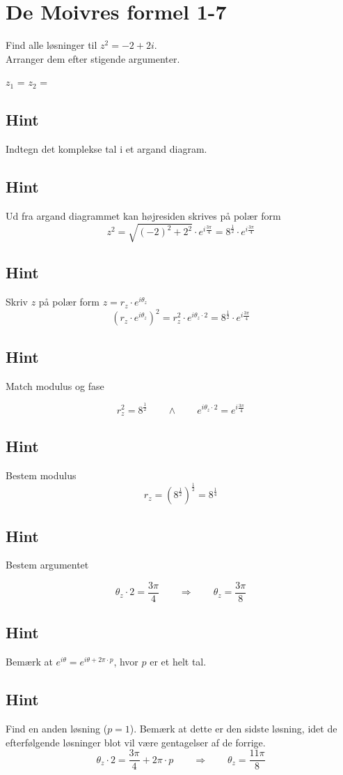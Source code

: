 \documentclass{article}
\newenvironment{exercise}[1]{\newpage\section{#1}}{}
\newcommand{\answerbox}[1]{\fbox{$#1$}}
\newcommand{\hint}{\subsection*{Hint}}
\begin{document}
\newpage

\begin{exercise}{De Moivres formel 1-7}
	
	Find alle løsninger til $z^2=-2+2i$. \\
	Arranger dem efter stigende argumenter.
	
	$z_1$ = \answerbox{8^{\frac{1}{4}} \cdot e^{i \frac{3\pi}{8}}}		$z_2$ = \answerbox{8^{\frac{1}{4}} \cdot e^{i \frac{11\pi}{8}}}	
	
	\hint 
	
	Indtegn det komplekse tal i et argand diagram. 
	
	\hint 
	
	Ud fra argand diagrammet kan højresiden skrives på polær form
	\[
	z^2 = \sqrt{(-2)^2+2^2} \cdot e^{i \frac{3 \pi}{4}} = 8^{\frac{1}{2}} \cdot e^{i \frac{3 \pi}{4}} 
	\]
	
	
	\hint
	
	Skriv $z$ på polær form $z = r_z \cdot e^{i \theta_z}$
	\[
	\left(r_z \cdot e^{i \theta_z}\right)^2 = r_z^2 \cdot e^{i \theta_z \cdot 2} = 8^{\frac{1}{2}} \cdot e^{i \frac{3 \pi}{4}} 
	\]
	
	\hint 
	Match modulus og fase
	
	\[
	r_z^2 = 8^{\frac{1}{2}}  \qquad \wedge \qquad e^{i \theta_z \cdot 2} = e^{i \frac{3 \pi}{4}} 
	\]
	
	\hint
	
	Bestem modulus
	\[
	r_z  =  \left(8^{\frac{1}{2}} \right)^{\frac{1}{2}} = 8^{\frac{1}{4}}
	\]
	
	\hint
	
	Bestem argumentet
	
	\[
	\theta_z \cdot 2 = \frac{3 \pi}{4} \qquad \Rightarrow \qquad  \theta_z = \frac{3\pi}{8}
	\]
	
	\hint
	
	Bemærk at $e^{i \theta} = e^{i \theta + 2 \pi \cdot p}$, hvor $p$ er et helt tal.
	
	\hint
	
	Find en anden løsning ($p=1$). Bemærk at dette er den sidste løsning, idet de efterfølgende løsninger blot vil være gentagelser af de forrige. 
	\[
	\theta_z \cdot 2 = \frac{3 \pi}{4}  + 2 \pi \cdot p \qquad \Rightarrow \qquad  \theta_z = \frac{11 \pi}{8}
	\]
	

\end{exercise}

\newpage
\end{document}
